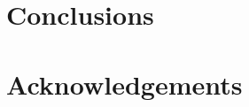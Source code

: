 \documentclass[fleqn,usenatbib]{mnras}
\begin{document}
\section{Conclusions}
\label{sec:conclusions}

\section*{Acknowledgements}



%



\begin{thebibliography}{99}
\end{thebibliography}




\appendix



\bsp	%
\label{lastpage}
\end{document}
